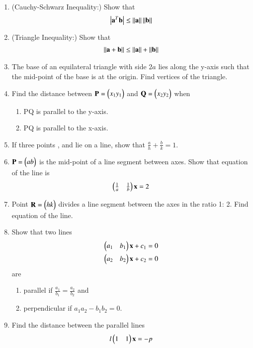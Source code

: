\begin{enumerate}[label=\arabic*.,ref=\thesubsection.\theenumi]
\item (Cauchy-Schwarz Inequality:) Show that 
%
\begin{align}
\left\vert\mathbf{a}^T\mathbf{b}\right\vert \le \left\lVert\mathbf{a}\right\rVert\left\lVert\mathbf{b}\right\rVert
\end{align}
%
%
\item (Triangle Inequality:) Show that 
%
\begin{align}
\left\lVert\mathbf{a}+\mathbf{b}\right\rVert \le \left\lVert\mathbf{a}\right\rVert+\left\lVert\mathbf{b}\right\rVert
\end{align}
%
%
\item The base of an equilateral triangle with side $2a$ lies along the y-axis such that the mid-point of the base is at the origin. Find vertices of the triangle.
\solution 

\item Find the distance between $\mathbf{P}= \begin{pmatrix}x_1 y_1\end{pmatrix}$ and $\mathbf{Q} =\begin{pmatrix}x_2 y_2\end{pmatrix}$ when
\begin{enumerate}
\item PQ is parallel to the y-axis.
\item PQ is parallel to the x-axis.
\end{enumerate}
\item If three points ,  and  lie on a line, show that
$\frac{a}{h}+\frac{b}{k}= 1$.
\item $\mathbf{P}=\begin{pmatrix}a b\end{pmatrix}$ is the mid-point of a line segment between axes. Show that equation of the line is
\begin{align}
\begin{pmatrix}\frac{1}{a} & \frac{1}{b}\end{pmatrix}\mathbf{x} = 2
\end{align}
\item  Point $\mathbf{R}= \begin{pmatrix}h k\end{pmatrix}$ divides a line segment between the axes in the ratio 1: 2. Find equation of the line.
\item Show that two lines 
\begin{align}
\begin{pmatrix}a_1 & b_1\end{pmatrix}\mathbf{x} +c_1&= 0
\\
\begin{pmatrix}a_2 & b_2\end{pmatrix}\mathbf{x} +c_2&= 0
\end{align}
are 
\begin{enumerate}
\item parallel if $\frac{a_1}{b_1}=\frac{a_2}{b_2}$ and
\item perpendicular if $a_1a_2-b_1b_2 = 0$.
\end{enumerate}
%
\item Find the distance between the parallel lines
%
\begin{align}
l\myvec{1 & 1}\vec{x} = -p
\\

\end{align}
\end{enumerate}
